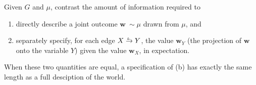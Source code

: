 \documentclass[letterpaper]{article} %
\theoremstyle{plain}
\theoremstyle{definition}
\theoremstyle{remark}
\newcommand\mat[1]{\mathbf{#1}}
\newcommand{\ed}[3]{#2
  \overset{\smash{\mskip-5mu\raisebox{-1pt}{$\scriptscriptstyle
        #1$}}}{\rightarrow} #3}
\begin{document}
Given $G$ and $\mu$, contrast the amount of
information required to 
\begin{enumerate}[label=(\alph*)]
\item directly describe a joint outcome  $\mat w ~ \sim \mu$
          drawn from $\mu$, and 
	\item separately specify, for each edge $\ed LXY$, the value
          $\mat w_Y$ (the projection of $\mat w$ onto the variable
          $Y$) given the value $\mat w_X$, in expectation. 
\end{enumerate}
When these two quantities are equal,
a specification of
(b) has exactly the same length as
a full desciption of the world.
%
%
\end{document}
